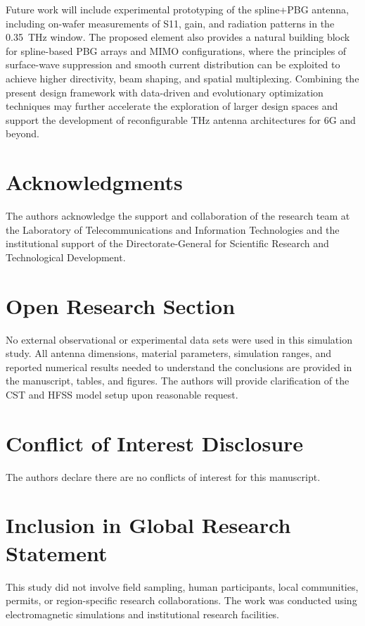\documentclass[draft]{agujournal2019}
\begin{document}
Future work will include experimental prototyping of the spline+PBG antenna, including on-wafer measurements of S11, gain, and radiation patterns in the 0.35~THz window. The proposed element also provides a natural building block for spline-based PBG arrays and MIMO configurations, where the principles of surface-wave suppression and smooth current distribution can be exploited to achieve higher directivity, beam shaping, and spatial multiplexing. Combining the present design framework with data-driven and evolutionary optimization techniques may further accelerate the exploration of larger design spaces and support the development of reconfigurable THz antenna architectures for 6G and beyond.



\section*{Acknowledgments}
The authors acknowledge the support and collaboration of the research team at the Laboratory of Telecommunications and Information Technologies and the institutional support of the Directorate-General for Scientific Research and Technological Development.

\section*{Open Research Section}
No external observational or experimental data sets were used in this simulation study. All antenna dimensions, material parameters, simulation ranges, and reported numerical results needed to understand the conclusions are provided in the manuscript, tables, and figures. The authors will provide clarification of the CST and HFSS model setup upon reasonable request.

\section*{Conflict of Interest Disclosure}
The authors declare there are no conflicts of interest for this manuscript.

\section*{Inclusion in Global Research Statement}
This study did not involve field sampling, human participants, local communities, permits, or region-specific research collaborations. The work was conducted using electromagnetic simulations and institutional research facilities.
\end{document}

